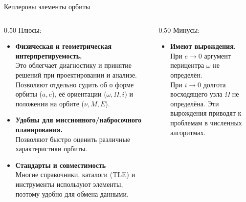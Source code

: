 \documentclass[9pt]{beamer}
\begin{document}
\begin{frame}{Кеплеровы элементы орбиты}
\begin{columns}[T,onlytextwidth]
  \begin{column}{0.50\textwidth}
    Плюсы:
    \begin{itemize}
        \item \textbf{Физическая и геометрическая интерпретируемость.} \\
        Это облегчает диагностику и принятие решений при проектировании и анализе. Позволяют отдельно судить об о форме орбиты ($ a, e$), её ориентации ($ \omega, \Omega, i$) и положении на орбите ($\nu, M, E$).

        \item \textbf{Удобны для миссионного/набросочного планирования.} \\
        Позволяют быстро оценить различные характеристики орбиты.

        \item \textbf{Стандарты и совместимость} \\
        Многие справочники, каталоги (TLE) и инструменты используют элементы, поэтому удобно для обмена данными.
        
    \end{itemize}
  \end{column}

  \begin{column}{0.50\textwidth}
    Минусы:
    \begin{itemize}
        \item \textbf{Имеют вырождения.} \\ 
        При $e \rightarrow 0$ аргумент перицентра $\omega$ не определён. \\
        При $i \rightarrow 0$ долгота восходящего узла $\Omega$ не определёна.
        Эти вырождения приводят к проблемам в численных алгоритмах.
    \end{itemize}
  \end{column}
\end{columns}
\end{frame}
\end{document}
